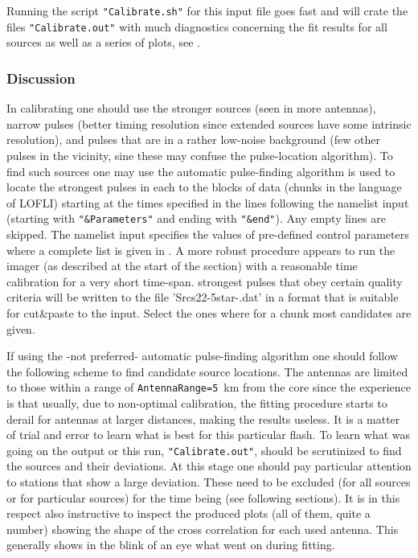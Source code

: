 Running the script \verb!"Calibrate.sh"! for this input file goes fast and will crate the files  \verb!"Calibrate.out"! with much diagnostics concerning the fit results for all sources as well as a series of plots, see .

\subsubsection{Discussion}

In calibrating one should use the stronger sources (seen in more antennas), narrow pulses (better timing resolution since extended sources have some intrinsic resolution), and pulses that are in a rather low-noise background (few other pulses in the vicinity, sine these may confuse the pulse-location algorithm). To find such sources one may use  the automatic pulse-finding algorithm is used to locate the strongest pulses in each to the blocks of data (chunks in the language of LOFLI) starting at the times specified in the lines following the namelist input (starting with \verb!"&Parameters"! and ending with \verb!"&end"!). Any empty lines are skipped. The namelist input specifies the values of pre-defined control parameters where a complete list is given in . A more robust procedure appears to run the imager (as described at the start of the section) with a reasonable time calibration for a very short time-span. strongest pulses that obey certain quality criteria will be written to the file 'Srcs22-5star-.dat' in a format that is suitable for cut\&paste to the input. Select the ones where for a chunk most candidates are given.

If using the -not preferred- automatic pulse-finding algorithm one should follow the following scheme to find candidate source locations.
The antennas are limited to those within a range of \verb!AntennaRange=5!~km from the core since the experience is that usually, due to non-optimal calibration, the fitting procedure starts to derail for antennas at larger distances, making the results useless. It is a matter of trial and error to learn what is best for this particular flash. To learn what was going on the output or this run, \verb!"Calibrate.out"!, should be scrutinized to find the sources and their deviations. At this stage one should pay particular attention to stations that show a large deviation. These need to be excluded (for all sources or for particular sources) for the time being (see following sections). It is in this respect also instructive to inspect the produced plots (all of them, quite a number) showing the shape of the cross correlation for each used antenna. This generally shows in the blink of an eye what went on during fitting.

